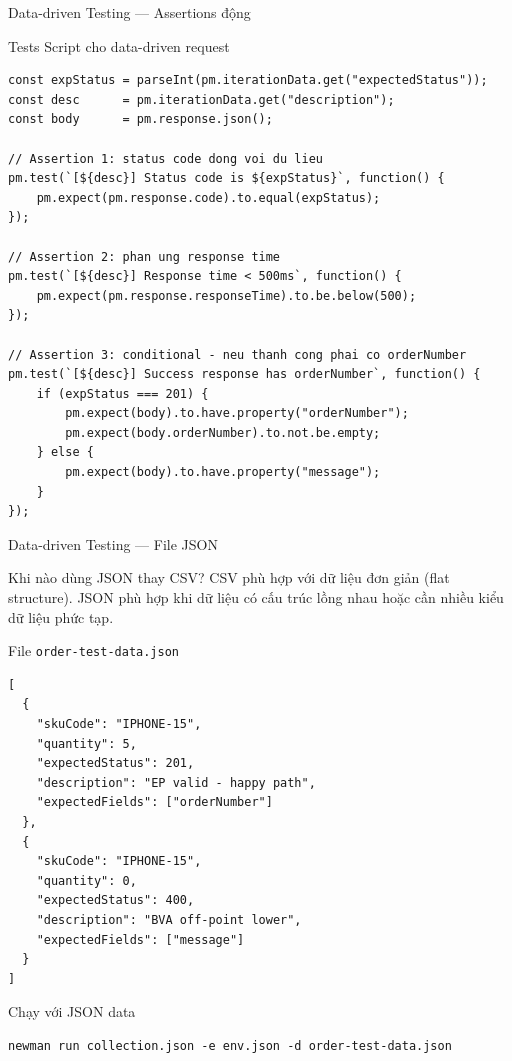 \documentclass[aspectratio=169,10pt]{beamer}
\begin{document}
\begin{frame}[fragile]{Data-driven Testing --- Assertions động}
  \begin{block}{Tests Script cho data-driven request}
\begin{lstlisting}[style=nonumber]
const expStatus = parseInt(pm.iterationData.get("expectedStatus"));
const desc      = pm.iterationData.get("description");
const body      = pm.response.json();

// Assertion 1: status code dong voi du lieu
pm.test(`[${desc}] Status code is ${expStatus}`, function() {
    pm.expect(pm.response.code).to.equal(expStatus);
});

// Assertion 2: phan ung response time
pm.test(`[${desc}] Response time < 500ms`, function() {
    pm.expect(pm.response.responseTime).to.be.below(500);
});

// Assertion 3: conditional - neu thanh cong phai co orderNumber
pm.test(`[${desc}] Success response has orderNumber`, function() {
    if (expStatus === 201) {
        pm.expect(body).to.have.property("orderNumber");
        pm.expect(body.orderNumber).to.not.be.empty;
    } else {
        pm.expect(body).to.have.property("message");
    }
});
\end{lstlisting}
  \end{block}
\end{frame}

\begin{frame}[fragile]{Data-driven Testing --- File JSON}
  \begin{block}{Khi nào dùng JSON thay CSV?}
    CSV phù hợp với dữ liệu đơn giản (flat structure).
    JSON phù hợp khi dữ liệu có cấu trúc lồng nhau
    hoặc cần nhiều kiểu dữ liệu phức tạp.
  \end{block}

  \begin{block}{File \texttt{order-test-data.json}}
\begin{lstlisting}[style=bash]
[
  {
    "skuCode": "IPHONE-15",
    "quantity": 5,
    "expectedStatus": 201,
    "description": "EP valid - happy path",
    "expectedFields": ["orderNumber"]
  },
  {
    "skuCode": "IPHONE-15",
    "quantity": 0,
    "expectedStatus": 400,
    "description": "BVA off-point lower",
    "expectedFields": ["message"]
  }
]
\end{lstlisting}
  \end{block}

  \begin{block}{Chạy với JSON data}
\begin{lstlisting}[style=bash]
newman run collection.json -e env.json -d order-test-data.json
\end{lstlisting}
  \end{block}
\end{frame}
\end{document}
